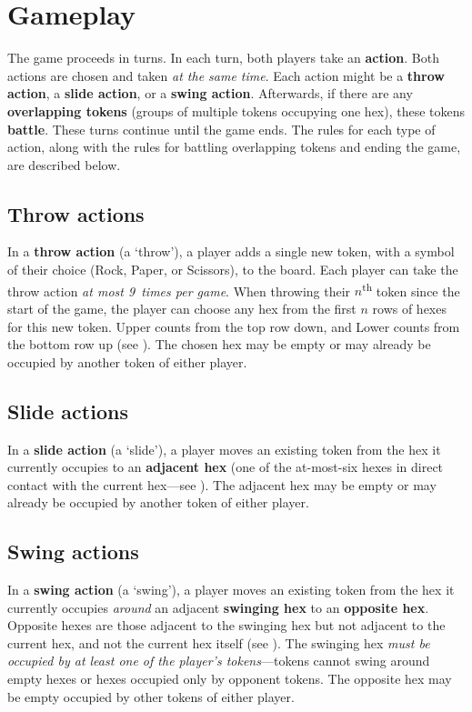 \documentclass[]{article}
\begin{document}
\newpage

\section*{Gameplay}

The game proceeds in turns. In each turn, both players take an
\textbf{action}.
%
Both actions are chosen and taken \emph{at the same time}.
%
Each action might be a \textbf{throw action}, a \textbf{slide action},
or a \textbf{swing action}.
%
Afterwards, if there are any \textbf{overlapping tokens}
(groups of multiple tokens occupying one hex), these tokens \textbf{battle}.
%
These turns continue until the game ends.
%
The rules for each type of action, along with the rules for battling
overlapping tokens and ending the game, are described below.

\subsection*{Throw actions}

In a \textbf{throw action} (a `throw'), a player adds a single new token,
with a symbol of their choice (Rock, Paper, or Scissors), to the board.
% 
Each player can take the throw action \emph{at most 9~times per game}.
%
When throwing their $n$\textsuperscript{th} token since the start of the
game, the player can choose any hex from the first $n$ rows of hexes for
this new token.
Upper counts from the top row down, and Lower counts from the bottom row
up (see ).
%
The chosen hex may be empty or may already be occupied by another token of
either player.

\subsection*{Slide actions}

In a \textbf{slide action} (a `slide'), a player moves an existing token from
the hex it currently occupies to an \textbf{adjacent hex}
    (one of the at-most-six hexes in direct contact with the current
    hex---see ).
%
The adjacent hex may be empty or may already be occupied by another token of
either player.

\subsection*{Swing actions}

In a \textbf{swing action} (a `swing'), a player moves an existing token from
the hex it currently occupies \emph{around} an adjacent \textbf{swinging hex}
to an \textbf{opposite hex}. Opposite hexes are those adjacent to the swinging
hex but not adjacent to the current hex, and not the current hex itself
(see ).
%
The swinging hex \emph{must be occupied by at least one of the player's
tokens}---tokens cannot swing around empty hexes or hexes occupied only
by opponent tokens.
%
The opposite hex may be empty occupied by other tokens of either player.
\end{document}
